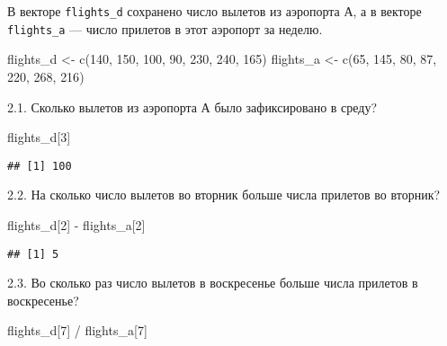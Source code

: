\documentclass[
]{article}
\newenvironment{Shaded}{\begin{snugshade}}{\end{snugshade}}
\newcommand{\DecValTok}[1]{\textcolor[rgb]{0.00,0.00,0.81}{#1}}
\newcommand{\FunctionTok}[1]{\textcolor[rgb]{0.00,0.00,0.00}{#1}}
\newcommand{\NormalTok}[1]{#1}
\newcommand{\OtherTok}[1]{\textcolor[rgb]{0.56,0.35,0.01}{#1}}
\newcommand{\SpecialCharTok}[1]{\textcolor[rgb]{0.00,0.00,0.00}{#1}}
\begin{document}
В векторе \texttt{flights\_d} сохранено число вылетов из аэропорта А, а
в векторе \texttt{flights\_a} --- число прилетов в этот аэропорт за
неделю.

\begin{Shaded}
\begin{Highlighting}[]
\NormalTok{flights\_d }\OtherTok{\textless{}{-}} \FunctionTok{c}\NormalTok{(}\DecValTok{140}\NormalTok{, }\DecValTok{150}\NormalTok{, }\DecValTok{100}\NormalTok{, }\DecValTok{90}\NormalTok{, }\DecValTok{230}\NormalTok{, }\DecValTok{240}\NormalTok{, }\DecValTok{165}\NormalTok{)}
\NormalTok{flights\_a }\OtherTok{\textless{}{-}} \FunctionTok{c}\NormalTok{(}\DecValTok{65}\NormalTok{, }\DecValTok{145}\NormalTok{, }\DecValTok{80}\NormalTok{, }\DecValTok{87}\NormalTok{, }\DecValTok{220}\NormalTok{, }\DecValTok{268}\NormalTok{, }\DecValTok{216}\NormalTok{)}
\end{Highlighting}
\end{Shaded}

2.1. Сколько вылетов из аэропорта А было зафиксировано в среду?

\begin{Shaded}
\begin{Highlighting}[]
\NormalTok{flights\_d[}\DecValTok{3}\NormalTok{]}
\end{Highlighting}
\end{Shaded}

\begin{verbatim}
## [1] 100
\end{verbatim}

2.2. На сколько число вылетов во вторник больше числа прилетов во
вторник?

\begin{Shaded}
\begin{Highlighting}[]
\NormalTok{flights\_d[}\DecValTok{2}\NormalTok{] }\SpecialCharTok{{-}}\NormalTok{ flights\_a[}\DecValTok{2}\NormalTok{] }
\end{Highlighting}
\end{Shaded}

\begin{verbatim}
## [1] 5
\end{verbatim}

2.3. Во сколько раз число вылетов в воскресенье больше числа прилетов в
воскресенье?

\begin{Shaded}
\begin{Highlighting}[]
\NormalTok{flights\_d[}\DecValTok{7}\NormalTok{] }\SpecialCharTok{/}\NormalTok{ flights\_a[}\DecValTok{7}\NormalTok{] }
\end{Highlighting}
\end{Shaded}
\end{document}
